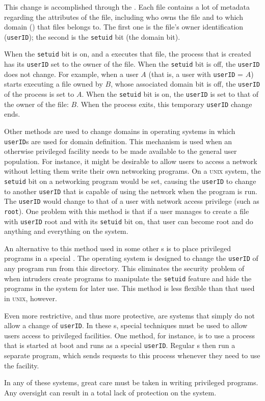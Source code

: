 This change is accomplished through the .
Each file contains a lot of metadata regarding the attributes of the file, including who owns the file and to which domain () that files belongs to.
The first one is the file's owner identification (\texttt{userID}); the second is the \texttt{setuid} bit (the domain bit).

When the \texttt{setuid} bit is on, and a  executes that file, the process that is created has its \texttt{userID} set to the owner of the file.
When the \texttt{setuid} bit is off, the \texttt{userID} does not change.
For example, when a user $A$ (that is, a user with \texttt{userID} = $A$) starts executing a file owned by $B$, whose associated domain bit is off, the \texttt{userID} of the process is set to $A$.
When the \texttt{setuid} bit is on, the \texttt{userID} is set to that of the owner of the file: $B$.
When the process exits, this temporary \texttt{userID} change ends.

Other methods are used to change domains in operating systems in which \texttt{userID}s are used for domain definition.
This mechanism is used when an otherwise privileged facility needs to be made available to the general user population.
For instance, it might be desirable to allow users to access a network without letting them write their own networking programs.
On a \textsc{unix} system, the \texttt{setuid} bit on a networking program would be set, causing the \texttt{userID} to change to another \texttt{userID} that is capable of using the network when the program is run.
The \texttt{userID} would change to that of a user with network access privilege (such as \texttt{root}).
One problem with this method is that if a user manages to create a file with \texttt{userID} root and with its \texttt{setuid} bit on, that user can become root and do anything and everything on the system.

An alternative to this method used in some other s is to place privileged programs in a special .
The operating system is designed to change the \texttt{userID} of any program run from this directory.
This eliminates the security problem of when intruders create programs to manipulate the \texttt{setuid} feature and hide the programs in the system for later use.
This method is less flexible than that used in \textsc{unix}, however.

Even more restrictive, and thus more protective, are systems that simply do not allow a change of \texttt{userID}.
In these s, special techniques must be used to allow users access to privileged facilities.
One method, for instance, is to use a  process that is started at boot and runs as a special \texttt{userID}.
Regular s then run a separate program, which sends requests to this process whenever they need to use the facility.

In any of these systems, great care must be taken in writing privileged programs.
Any oversight can result in a total lack of protection on the system.

